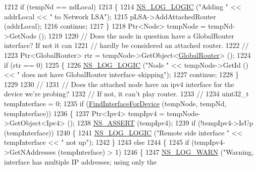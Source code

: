 \begin{DoxyCode}
1212           \textcolor{keywordflow}{if} (tempNd == ndLocal)
1213             \{
1214               \hyperlink{group__logging_ga88acd260151caf2db9c0fc84997f45ce}{NS\_LOG\_LOGIC} (\textcolor{stringliteral}{"Adding "} << addrLocal << \textcolor{stringliteral}{" to Network LSA"});
1215               pLSA->AddAttachedRouter (addrLocal);
1216               \textcolor{keywordflow}{continue};
1217             \}
1218           Ptr<Node> tempNode = tempNd->GetNode ();
1219 
1220           \textcolor{comment}{// Does the node in question have a GlobalRouter interface?  If not it can}
1221           \textcolor{comment}{// hardly be considered an attached router.}
1222           \textcolor{comment}{//}
1223           Ptr<GlobalRouter> rtr = tempNode->GetObject<\hyperlink{classns3_1_1GlobalRouter_a778050c70fe491c0fe62b7cf6b10aaf6}{GlobalRouter}> ();
1224           \textcolor{keywordflow}{if} (rtr == 0)
1225             \{ 
1226               \hyperlink{group__logging_ga88acd260151caf2db9c0fc84997f45ce}{NS\_LOG\_LOGIC} (\textcolor{stringliteral}{"Node "} << tempNode->GetId () << \textcolor{stringliteral}{" does not have GlobalRouter
       interface--skipping"});
1227               \textcolor{keywordflow}{continue};
1228             \}
1229 
1230           \textcolor{comment}{//}
1231           \textcolor{comment}{// Does the attached node have an ipv4 interface for the device we're probing?}
1232           \textcolor{comment}{// If not, it can't play router.}
1233           \textcolor{comment}{//}
1234           uint32\_t tempInterface = 0;
1235           \textcolor{keywordflow}{if} (\hyperlink{classns3_1_1GlobalRouter_a7b30c3c09f93e3f3ac7cfe787b51d127}{FindInterfaceForDevice} (tempNode, tempNd, tempInterface))
1236             \{
1237               Ptr<Ipv4> tempIpv4 = tempNode->GetObject<Ipv4> ();
1238               \hyperlink{assert_8h_a6dccdb0de9b252f60088ce281c49d052}{NS\_ASSERT} (tempIpv4);
1239               \textcolor{keywordflow}{if} (!tempIpv4->IsUp (tempInterface))
1240                 \{
1241                   \hyperlink{group__logging_ga88acd260151caf2db9c0fc84997f45ce}{NS\_LOG\_LOGIC} (\textcolor{stringliteral}{"Remote side interface "} << tempInterface << \textcolor{stringliteral}{" not up"});
1242                 \}
1243               \textcolor{keywordflow}{else} 
1244                 \{
1245                   \textcolor{keywordflow}{if} (tempIpv4->GetNAddresses (tempInterface) > 1)
1246                     \{
1247                       \hyperlink{group__logging_gade7208b4009cdf0e25783cd26766f559}{NS\_LOG\_WARN} (\textcolor{stringliteral}{"Warning, interface has multiple IP addresses; using only the
}
\end{DoxyCode}
